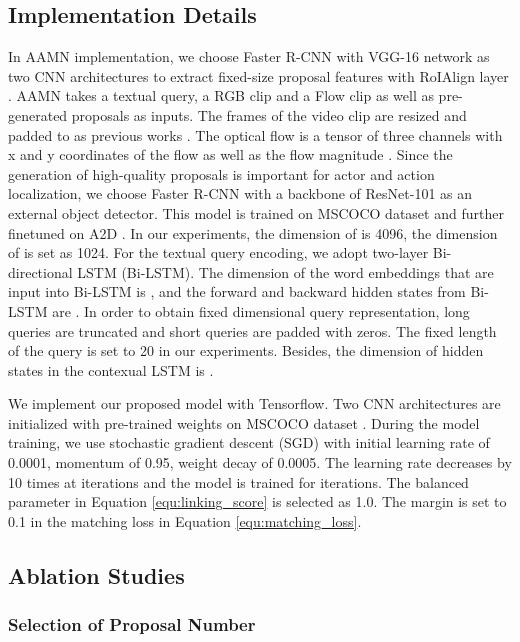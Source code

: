 \documentclass[journal]{IEEEtran}
\begin{document}
\subsection{Implementation Details}



In AAMN implementation, we choose Faster R-CNN \cite{ren2015faster} with VGG-16 network as two CNN architectures to extract fixed-size proposal features with RoIAlign layer \cite{he2017mask}. AAMN takes a textual query, a RGB clip and a Flow clip as well as pre-generated proposals as inputs. The frames of the video clip are resized and padded to  as previous works \cite{gavrilyuk2018actor,wang2019asymmetric}. The optical flow is a tensor of three channels with x and y coordinates of the flow as well as the flow magnitude \cite{kalogeiton2017joint,ji2018end}. Since the generation of high-quality proposals is important for actor and action localization, we choose Faster R-CNN \cite{ren2015faster} with a backbone of ResNet-101 as an external object detector. This model is trained on MSCOCO dataset \cite{lin2014microsoft} and further finetuned on A2D \cite{gavrilyuk2018actor}. In our experiments, the dimension of  is 4096, the dimension of  is set as 1024. For the textual query encoding, we adopt two-layer Bi-directional LSTM (Bi-LSTM). The dimension of the word embeddings that are input into Bi-LSTM is , and the forward and backward hidden states from Bi-LSTM are . In order to obtain fixed dimensional query representation, long queries are truncated and short queries are padded with zeros. The fixed length of the query is set to 20 in our experiments. Besides, the dimension of hidden states in the contexual LSTM is .

We implement our proposed model with Tensorflow. Two CNN architectures are initialized with pre-trained weights on MSCOCO dataset \cite{lin2014microsoft}. During the model training, we use stochastic gradient descent (SGD) with initial learning rate of 0.0001, momentum of 0.95, weight decay of 0.0005. The learning rate decreases by 10 times at  iterations and the model is trained for  iterations. The balanced parameter  in Equation \ref{equ:linking_score} is selected as 1.0. The margin  is set to 0.1 in the matching loss  in Equation \ref{equ:matching_loss}.


\subsection{Ablation Studies}

\subsubsection{Selection of Proposal Number}
\end{document}
